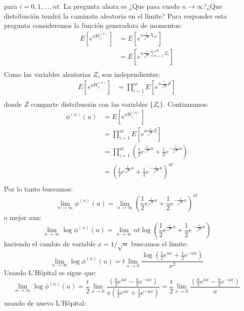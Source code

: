 \documentclass{extreport}
\theoremstyle{definicion}
\theoremstyle{propiedad}
\theoremstyle{teorema}
\begin{document}
para $i=0,1,\ldots, nt$. La pregunta ahora es ¿Que pasa cuado $n\rightarrow\infty$?¿Que distribución tendrá la caminata aleatoria en el límite? Para responder esta pregunta consideremos la función generadora de momentos:
\begin{align*}
    E\left[e^{uW_{t}^{(n)}}\right] & = E\left[e^{u\frac{1}{\sqrt{n}}X_{nt}}\right]\\
                                   & = E\left[e^{u\frac{1}{\sqrt{n}}\sum_{i=1}^{nt}Z_i}\right]\\
\end{align*}
Como las variables aleatorias $Z_i$ son independientes: 
\begin{align*}
    E\left[e^{uW_{t}^{(n)}}\right] & = \prod_{i= 1}^{nt}E\left[e^{u\frac{1}{\sqrt{n}}Z}\right]\\
\end{align*}
donde $Z$ comparte distribución con las variables $\{Z_i\}$. Continuamos:
\begin{align*}
                                  \phi^{(n)}(u) & = E\left[e^{uW_{t}^{(n)}}\right] \\
                                   & = \prod_{i= 1}^{nt}E\left[e^{u\frac{1}{\sqrt{n}}Z}\right]\\
                                   & = \prod_{i=1}^{nt}\left(\frac{1}{2}e^{\frac{1}{\sqrt{n}}u} + \frac{1}{2}e^{-\frac{1}{\sqrt{n}}u}\right) \\
                                   & = \left(\frac{1}{2}e^{\frac{1}{\sqrt{n}}u} + \frac{1}{2}e^{-\frac{1}{\sqrt{n}}u}\right)^{nt} \\
\end{align*}
Por lo tanto buscamos:
$$
\lim_{n\rightarrow\infty}\phi^{(n)}(u) = \lim_{n\rightarrow\infty}\left(\frac{1}{2}e^{\frac{1}{\sqrt{n}}u} + \frac{1}{2}e^{-\frac{1}{\sqrt{n}}u}\right)^{nt}
$$
o mejor aun:
$$
\lim_{n\rightarrow\infty}\log\phi^{(n)}(u) = \lim_{n\rightarrow\infty}nt\log\left(\frac{1}{2}e^{\frac{1}{\sqrt{n}}u} + \frac{1}{2}e^{-\frac{1}{\sqrt{n}}u}\right)
$$
haciendo el cambio de variable $x = 1/\sqrt{n}$ buscamos el limite:
$$
\lim_{n\rightarrow\infty}\log\phi^{(n)}(u) = t\lim_{x\rightarrow 0}\frac{\log\left(\frac{1}{2}e^{ux} + \frac{1}{2}e^{-ux}\right)}{x^2}
$$
Usando L'Hôpital se sigue que:
$$
\lim_{n\rightarrow\infty}\log\phi^{(n)}(u) = \frac{t}{2}\lim_{x\rightarrow 0}\frac{\left(\frac{u}{2}e^{ux} - \frac{u}{2}e^{-ux}\right)}{x\left(\frac{1}{2}e^{ux} + \frac{1}{2}e^{-ux}\right)} = \frac{t}{2}\lim_{x\rightarrow 0}\frac{\left(\frac{u}{2}e^{ux} - \frac{u}{2}e^{-ux}\right)}{x}
$$
usando de nuevo L'Hôpital:
\end{document}
